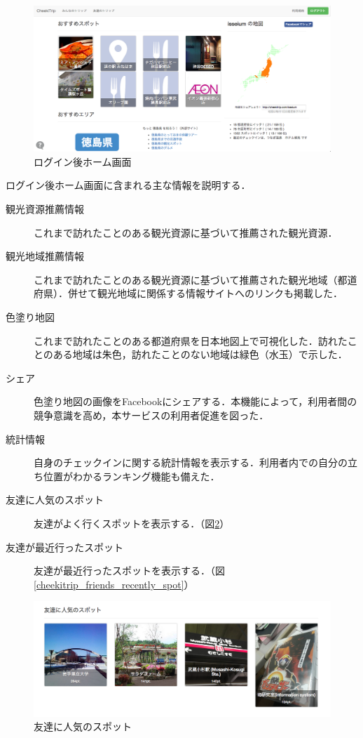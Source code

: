 \documentclass{jsarticle}
\begin{document}
\begin{figure}[!ht]
\begin{center}
\includegraphics[width=12.0cm]{./image/cheekitrip_home.png}
\caption{ログイン後ホーム画面}
\label{cheekitrip_home}
\end{center}
\end{figure}

ログイン後ホーム画面に含まれる主な情報を説明する．

\begin{description}
\item[観光資源推薦情報] これまで訪れたことのある観光資源に基づいて推薦された観光資源．
\item[観光地域推薦情報] これまで訪れたことのある観光資源に基づいて推薦された観光地域（都道府県）．併せて観光地域に関係する情報サイトへのリンクも掲載した．
\item[色塗り地図] これまで訪れたことのある都道府県を日本地図上で可視化した．訪れたことのある地域は朱色，訪れたことのない地域は緑色（水玉）で示した．
\item[シェア] 色塗り地図の画像をFacebookにシェアする．本機能によって，利用者間の競争意識を高め，本サービスの利用者促進を図った．
\item[統計情報] 自身のチェックインに関する統計情報を表示する．利用者内での自分の立ち位置がわかるランキング機能も備えた．
\item[友達に人気のスポット] 友達がよく行くスポットを表示する．（図\ref{cheekitrip_friends_popular_spot}）
\item[友達が最近行ったスポット] 友達が最近行ったスポットを表示する．（図\ref{cheekitrip_friends_recently_spot}）
\end{description}

\begin{figure}[!ht]
\begin{center}
\includegraphics[width=12.0cm]{./image/cheekitrip_friends_popular_spot.png}
\caption{友達に人気のスポット}
\label{cheekitrip_friends_popular_spot}
\end{center}
\end{figure}
\end{document}
